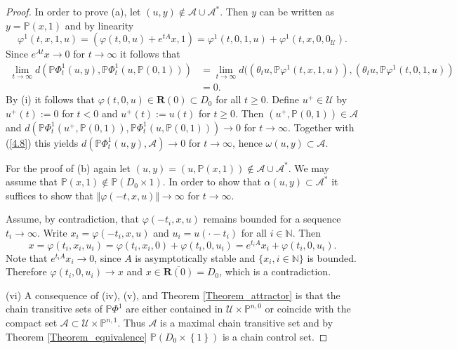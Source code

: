 \documentclass{siamltex}%
\begin{document}
\begin{proof}
In order to prove (a), let $(u,y)\not \in \mathcal{A}\cup\mathcal{A}^{\ast}$.
Then $y$ can be written as $y=\mathbb{P}(x,1)$ and by linearity%
\[
\varphi^{1}(t,x,1,u)=(\varphi(t,0,u)+e^{tA}x,1)=\varphi^{1}(t,0,1,u)+\varphi
^{1}(t,x,0,0_{\mathcal{U}}).
\]
Since $e^{At}x\rightarrow0$ for $t\rightarrow\infty$ it follows that%
\begin{align}
\lim_{t\rightarrow\infty}d(\mathbb{P}\Phi_{t}^{1}(u,y),\mathbb{P}\Phi_{t}%
^{1}(u,\mathbb{P}(0,1)))  &  =\lim_{t\rightarrow\infty}d(\left(  \theta
_{t}u,\mathbb{P}\varphi^{1}(t,x,1,u)\right)  ,(\theta_{t}u,\mathbb{P}%
\varphi^{1}(t,0,1,u))\nonumber\\
&  =0. \label{4.8}%
\end{align}
By (i) it follows that $\varphi(t,0,u)\in\mathbf{R}(0)\subset D_{0}$ for all
$t\geq0$. Define $u^{+}\in\mathcal{U}$ by $u^{+}(t):=0$ for $t<0$ and
$u^{+}(t):=u(t)$ for $t\geq0$. Then $(u^{+},\mathbb{P}(0,1))\in\mathcal{A}$
and $d(\mathbb{P}\Phi_{t}^{1}(u^{+},\mathbb{P}(0,1)),\mathbb{P}\Phi_{t}%
^{1}(u,\mathbb{P}(0,1)))\rightarrow0$ for $t\rightarrow\infty$. Together with
(\ref{4.8}) this yields $d(\mathbb{P}\Phi_{t}^{1}(u,y),\mathcal{A}%
)\rightarrow0$ for $t\rightarrow\infty$, hence $\omega(u,y)\subset\mathcal{A}$.

For the proof of (b) again let $(u,y)=(u,\mathbb{P}(x,1))\not \in
\mathcal{A}\cup\mathcal{A}^{\ast}$. We may assume that $\mathbb{P}%
(x,1)\not \in \mathbb{P}(D_{0}\times{1})$. In order to show that
$\alpha(u,y)\subset\mathcal{A}^{\ast}$ it suffices to show that $\Vert
\varphi(-t,x,u)\Vert\rightarrow\infty$ for $t\rightarrow\infty$.

Assume, by contradiction, that $\varphi(-t_{i},x,u)$ remains bounded for a
sequence $t_{i}\rightarrow\infty$. Write $x_{i}=\varphi(-t_{i},x,u)$ and
$u_{i}=u(\cdot-t_{i})$ for all $i\in\mathbb{N}$. Then
\[
x=\varphi(t_{i},x_{i},u_{i})=\varphi(t_{i},x_{i},0)+\varphi(t_{i}%
,0,u_{i})=e^{t_{i}A}x_{i}+\varphi(t_{i},0,u_{i}).
\]
Note that $e^{t_{i}A}x_{i}\rightarrow0$, since $A$ is asymptotically stable
and $\{x_{i},i\in\mathbb{N}\}$ is bounded. Therefore $\varphi(t_{i}%
,0,u_{i})\rightarrow x$ and $x\in\overline{\mathbf{R}(0)}=D_{0}$, which is a contradiction.

(vi) A consequence of (iv), (v), and Theorem \ref{Theorem_attractor} is that
the chain transitive sets of $\mathbb{P}\Phi^{1}$ are either contained in
$\mathcal{U}\times\mathbb{P}^{n,0}$ or coincide with the compact set
$\mathcal{A}\subset\mathcal{U}\times\mathbb{P}^{n,1}$. Thus $\mathcal{A}$ is a
maximal chain transitive set and by Theorem \ref{Theorem_equivalence}
$\mathbb{P}(D_{0}\times\left\{  1\right\}  )$ is a chain control set.
\end{proof}
\end{document}
